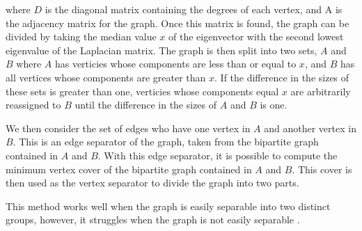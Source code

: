 \documentclass{article}
\begin{document}
    where $D$ is the diagonal matrix containing the degrees of each vertex, and A is the adjacency matrix for the graph. Once this matrix is found, the graph can be divided by taking the median value $x$ of the eigenvector with the second lowest eigenvalue of the Laplacian matrix. The graph is then split into two sets, $A$ and $B$ where $A$ has verticies whose components are less than or equal to $x$, and $B$ has all vertices whose components are greater than $x$. If the difference in the sizes of these sets is greater than one, verticies whose components equal $x$ are arbitrarily reassigned to $B$ until the difference in the sizes of $A$ and $B$ is one.
    \par
    We then consider the set of edges who have one vertex in $A$ and another vertex in $B$. This is an edge separator of the graph, taken from the bipartite graph contained in $A$ and $B$. With this edge separator, it is possible to compute the minimum vertex cover of the bipartite graph contained in $A$ and $B$. This cover is then used as the vertex separator to divide the graph into two parts.
    \par
    This method works well when the graph is easily separable into two distinct groups, however, it struggles when the graph is not easily separable \cite{Newman2004}.
\end{document}

